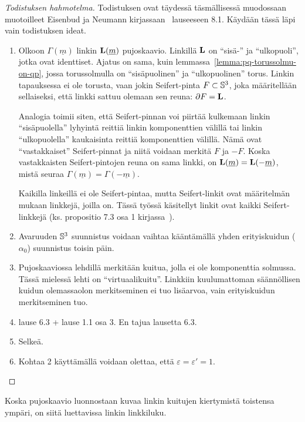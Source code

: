 \begin{proof}[Todistuksen hahmotelma]
    Todistuksen ovat täydessä täsmällisessä muodossaan muotoilleet Eisenbud ja Neumann kirjassaan~\citep{EN1985} lauseeseen 8.1. Käydään tässä läpi vain todistuksen ideat.
    \begin{enumerate}
        \item Olkoon $\Gamma(\underline{m})$ linkin $\linkki(\underline{m})$ pujoskaavio. Linkillä $\linkki$ on ``sisä-'' ja ``ulkopuoli'', jotka ovat identtiset. Ajatus on sama, kuin lemmassa~\ref{lemma:pq-torussolmu-on-qp}, jossa torussolmulla on ``sisäpuolinen'' ja ``ulkopuolinen'' torus. Linkin tapauksessa ei ole torusta, vaan jokin Seifert-pinta $F\subset\S^3$, joka määritellään sellaiseksi, että linkki sattuu olemaan sen reuna: $\partial F=\linkki$. 
        
        Analogia toimii siten, että Seifert-pinnan voi piirtää kulkemaan linkin ``sisäpuolella'' lyhyintä reittiä linkin komponenttien välillä tai linkin ``ulkopuolella'' kaukaisinta reittiä komponenttien välillä. Nämä ovat ``vastakkaiset'' Seifert-pinnat ja niitä voidaan merkitä $F$ ja $-F$. Koska vastakkaisten Seifert-pintojen reuna on sama linkki, on $\linkki(\underline{m})=\linkki(-\underline{m})$, mistä seuraa $\Gamma(\underline{m})=\Gamma(-\underline{m})$.
        
        Kaikilla linkeillä ei ole Seifert-pintaa, mutta Seifert-linkit ovat määritelmän mukaan linkkejä, joilla on. Tässä työssä käsitellyt linkit ovat kaikki Seifert-linkkejä (ks. propositio 7.3 osa 1 kirjassa~\citep{EN1985}).
        \item Avaruuden $\S^3$ suunnistus voidaan vaihtaa kääntämällä yhden erityiskuidun ($\alpha_0$) suunnistus toisin päin.
        \item Pujoskaaviossa lehdillä merkitään kuitua, jolla ei ole komponenttia solmussa. Tässä mielessä lehti on ``virtuaalikuitu''. Linkkiin kuulumattoman säännöllisen kuidun olemassaolon merkitseminen ei tuo lisäarvoa, vain erityiskuidun merkitseminen tuo.
        \item \citep{EN1985} lause 6.3 + lause 1.1 osa 3. En tajua lausetta 6.3.
        \item Selkeä.
        \item Kohtaa 2 käyttämällä voidaan olettaa, että $\varepsilon=\varepsilon'=1$.
    \end{enumerate}
\end{proof}
Koska pujoskaavio luonnostaan kuvaa linkin kuitujen kiertymistä toistensa ympäri, on siitä luettavissa linkin linkkiluku.
